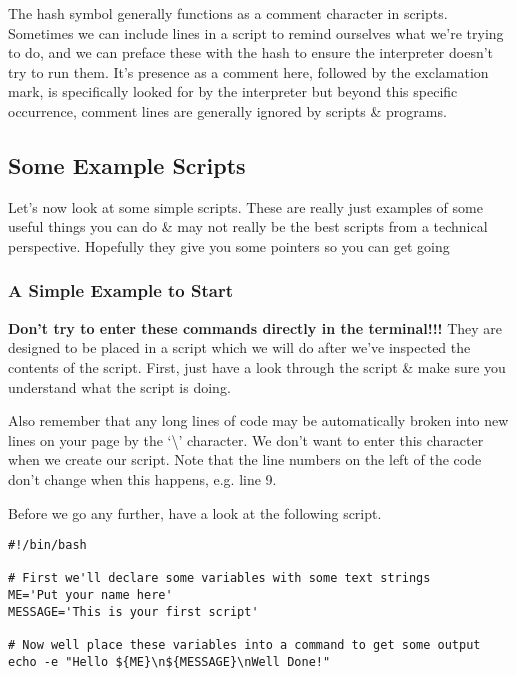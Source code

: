 \begin{note}
The hash symbol generally functions as a comment character in scripts.
Sometimes we can include lines in a script to remind ourselves what we're trying to do, and we can preface these with the hash to ensure the interpreter doesn't try to run them.
It's presence as a comment here, followed by the exclamation mark, is specifically looked for by the interpreter but beyond this specific occurrence, comment lines are generally ignored by scripts \& programs.
\end{note}

\subsection{Some Example Scripts}
Let's now look at some simple scripts.
These are really just examples of some useful things you can do \& may not really be the best scripts from a technical perspective.
Hopefully they give you some pointers so you can get going


\subsubsection*{A Simple Example to Start}
\begin{warning}
\textbf{Don't try to enter these commands directly in the terminal!!!}
They are designed to be placed in a script which we will do after we've inspected the contents of the script.
First,  just have a look through the script \& make sure you understand what the script is doing.

Also remember that any long lines of code may be automatically broken into new lines on your page by the `\textbackslash ' character.
We don't want to enter this character when we create our script.
Note that the line numbers on the left of the code don't change when this happens, e.g. line 9.
\end{warning}

Before we go any further, have a look at the following script.

\begin{lstlisting}[style=command_syntax]
#!/bin/bash

# First we'll declare some variables with some text strings
ME='Put your name here'
MESSAGE='This is your first script'

# Now well place these variables into a command to get some output
echo -e "Hello ${ME}\n${MESSAGE}\nWell Done!"
\end{lstlisting}

